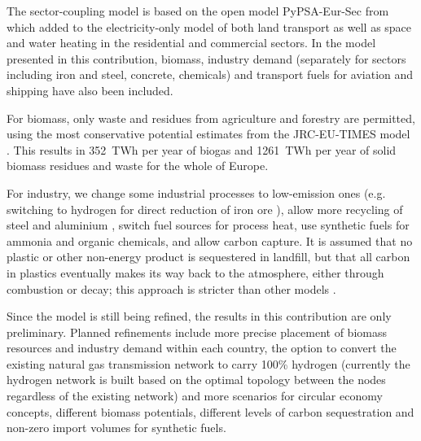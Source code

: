 The sector-coupling model is based on the open model PyPSA-Eur-Sec from
\cite{brownSynergiesSector2018} which added to the electricity-only model of
\cite{schlachtbergerBenefitsCooperation2017} both land transport as well as space and water heating
in the residential and commercial sectors. In the model presented in this
contribution, biomass, industry demand (separately for sectors including iron
and steel, concrete, chemicals) and transport fuels for aviation and shipping
have also been included.

For biomass, only waste and residues from agriculture and forestry are
permitted, using the most conservative potential estimates from the JRC-EU-TIMES
model \cite{jrcbiomass2015}. This results in 352~TWh per year of biogas and
1261~TWh per year of solid biomass residues and waste for the whole of Europe.

For industry, we change some industrial processes to low-emission ones (e.g.
switching to hydrogen for direct reduction of iron ore \cite{voglAssessmentHydrogen2018}), allow
more recycling of steel and aluminium \cite{circular_economy}, switch fuel
sources for process heat, use synthetic fuels for ammonia and organic chemicals,
and allow carbon capture. It is assumed that no plastic or other non-energy
product is sequestered in landfill, but that all carbon in plastics eventually
makes its way back to the atmosphere, either through combustion or decay; this
approach is stricter than other models \cite{in-depth_2018}.

Since the model is still being refined, the results in this contribution are
only preliminary. Planned refinements include more precise placement of biomass
resources and industry demand within each country, the option to convert the
existing natural gas transmission network to carry 100\% hydrogen (currently the
hydrogen network is built based on the optimal topology between the nodes
regardless of the existing network) and more scenarios for circular economy
concepts, different biomass potentials, different levels of carbon sequestration
and non-zero import volumes for synthetic fuels.